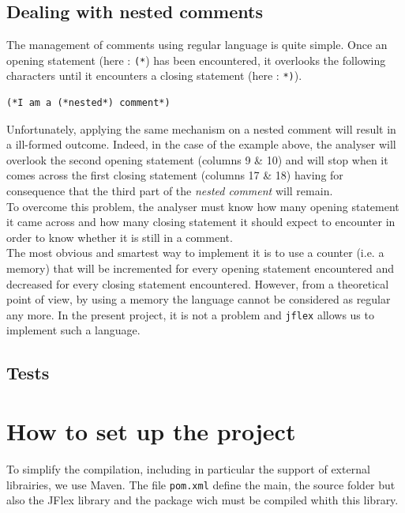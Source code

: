 \documentclass[a4paper,11pt]{article}
\begin{document}
  \subsection{Dealing with nested comments}
    The management of comments using regular language is quite simple. Once an opening statement (here : \verb|(*|) has been encountered, it overlooks the following characters until it encounters a closing statement (here : \verb|*)|).
    \begin{lstlisting}
(*I am a (*nested*) comment*)
    \end{lstlisting}
    Unfortunately, applying the same mechanism on a nested comment will result in a ill-formed outcome. Indeed, in the case of the example above, the analyser will overlook the second opening statement (columns 9 \& 10) and will stop when it comes across the first closing statement (columns 17 \& 18) having for consequence that the third part of the \textit{nested comment} will remain.\\
    To overcome this problem, the analyser must know how many opening statement it came across and how many closing statement it should expect to encounter in order to know whether it is still in a comment.\\
    The most obvious and smartest way to implement it is to use a counter (i.e. a memory) that will be incremented for every opening statement encountered and decreased for every closing statement encountered. However, from a theoretical point of view, by using a memory the language cannot be considered as regular any more. In the present project, it is not a problem and \verb|jflex| allows us to implement such a language.
    
  \subsection{Tests}
    
    
    
    

\section{How to set up the project}
  To simplify the compilation, including in particular the support of external librairies, we use Maven.  The file \verb|pom.xml| define the main, the source folder but also the JFlex library and the package wich must be compiled whith this library.
  
\end{document}
